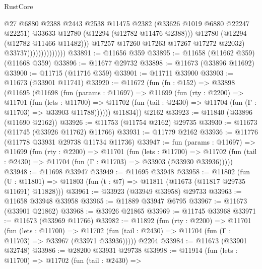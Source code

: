 \begin{lexlean}{RustCore}
\begin{coremodule}
                                      @27
                                      @6880
                                      @2388
                                      @2443
                                      @2538
                                      @11475
                                      @2382
                                      (@33626 @1019 @6880 @22247 @22251)
                                      @33633
                                      @12780
                                      (@12294 (@12782 @11476 @2388)))
                                    @12780
                                    (@12294 (@12782 @11466 @11482)))
                                  @17257
                                  @17260
                                  @17263
                                  @17267
                                  @17272
                                  @22032)
                                @33737))))))))))))))
@33891 := @11656 @359
@33895 := @11658 (@11662 @359) (@11668 @359)
@33896 := @11677 @29732
@33898 := @11673 (@33896 @11692)
@33900 := @11715 (@11716 @359)
@33901 := @11711 @33900
@33903 := @11673 (@33901 @11741)
@33920 := @11672
    (fun (fn : @152) =>
    @33898
      (@11695
        (@11698
          (fun (params : @11697) =>
          @11699
            (fun (rty : @2200) =>
            @11701
              (fun (lets : @11700) =>
              @11702 (fun (tail : @2430) => @11704 (fun (Γ : @11703) => @33903 @11788))))))
        @11834))
    @2162
@33923 := @11840 (@33896 (@11690 @2162))
@33926 := @11753 (@11754 @2162) @29735
@33930 := @11673 (@11745 (@33926 @11762) @11766)
@33931 := @11779 @2162
@33936 := @11776 (@11778 @33931 @29738 @11734 @11736)
@33947 := fun (params : @11697) =>
  @11699
    (fun (rty : @2200) =>
    @11701
      (fun (lets : @11700) =>
      @11702 (fun (tail : @2430) => @11704 (fun (Γ : @11703) => @33903 (@33930 @33936)))))
@33948 := @11698 @33947
@33949 := @11695 @33948
@33958 := @11802
    (fun (U : @11801) => @11803 (fun (t : @7) => @11811 (@11673 (@11817 @29735 @11691) @11828)))
@33961 := @33923 (@33949 @33958) @29733
@33963 := @11658 @33948 @33958
@33965 := @11889 @33947 @6795
@33967 := @11673 (@33901 @21862)
@33968 := @33926 @21865
@33969 := @11745 @33968
@33971 := @11673 (@33969 @11766)
@33982 := @11892
    (fun (rty : @2200) =>
    @11701
      (fun (lets : @11700) =>
      @11702 (fun (tail : @2430) => @11704 (fun (Γ : @11703) => @33967 (@33971 @33936)))))
    @2204
@33984 := @11673 (@33901 @32748)
@33986 := @28200 @33931 @29738
@33998 := @11914
    (fun (lets : @11700) =>
    @11702
      (fun (tail : @2430) =>

\end{coremodule}
\end{lexlean}
